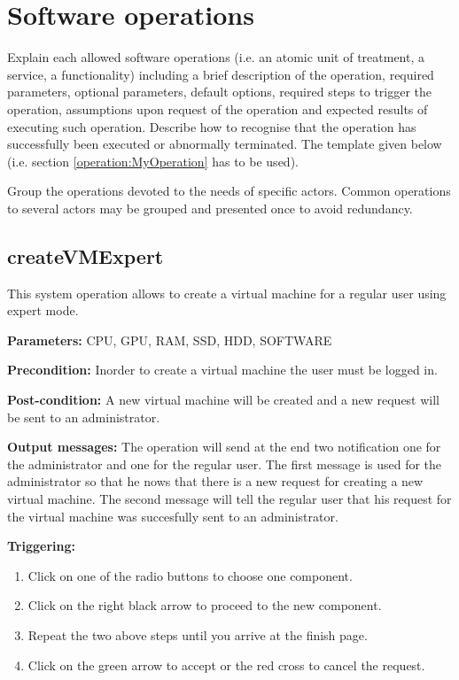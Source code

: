 \chapter{Software operations}
\label{chap:soptware_operations}


Explain each allowed software operations (i.e. an atomic unit of treatment, a service, a functionality) including a brief description of the operation, required parameters, optional parameters, default options, required steps to trigger the operation, assumptions upon request of the operation and expected results of executing such operation.
Describe how to recognise that the operation has successfully been executed or
abnormally terminated. The template given below (i.e. section \ref{operation:MyOperation} has to be used).

Group the operations devoted to the needs of specific actors. Common
operations to several actors may be grouped and presented once to avoid redundancy.


\section{createVMExpert}
\label{operation:createVMExpert}
This system operation allows to create a virtual machine for a regular user
using expert mode.

\begin{description}

\item \textbf{Parameters:} CPU, GPU, RAM, SSD, HDD, SOFTWARE
\item \textbf{Precondition:} Inorder to create a virtual machine the user must
be logged in.
\item \textbf{Post-condition:} A new virtual machine will be created and a new
request will be sent to an administrator.
\item \textbf{Output messages:} The operation will send at the end two
notification one for the administrator and one for the regular user. The first
message is used for the administrator so that he nows that there is a new
request for creating a new virtual machine. The second message will tell the
regular user that his request for the virtual machine was succesfully sent to an
administrator. 

\item \textbf{Triggering:}
\begin{enumerate}
\item Click on one of the radio buttons to choose one component.
\item Click on the right black arrow to proceed to the new component.
\item Repeat the two above steps until you arrive at the finish page.
\item Click on the green arrow to accept or the red cross to cancel the request.
\end{enumerate}

 
\end{description}

